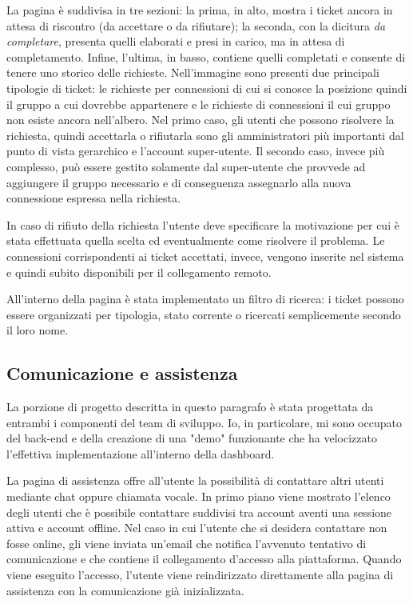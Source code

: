 La pagina è suddivisa in tre sezioni: la prima, in alto, mostra i ticket ancora in attesa di riscontro (da accettare o da rifiutare); la seconda, con la dicitura \textit{da completare}, presenta quelli elaborati e presi in carico, ma in attesa di completamento. Infine, l'ultima, in basso, contiene quelli completati e consente di tenere uno storico delle richieste.
Nell'immagine sono presenti due principali tipologie di ticket: le richieste per connessioni di cui si conosce la posizione quindi il gruppo a cui dovrebbe appartenere e le richieste di connessioni il cui gruppo non esiste ancora nell'albero. Nel primo caso, gli utenti che possono risolvere la richiesta, quindi accettarla o rifiutarla sono gli amministratori più importanti dal punto di vista gerarchico e l'account super-utente. Il secondo caso, invece più complesso, può essere gestito solamente dal super-utente che provvede ad aggiungere il gruppo necessario e di conseguenza assegnarlo alla nuova connessione espressa nella richiesta.

In caso di rifiuto della richiesta l'utente deve specificare la motivazione per cui è stata effettuata quella scelta ed eventualmente come risolvere il problema. Le connessioni corrispondenti ai ticket accettati, invece, vengono inserite nel sistema e quindi subito disponibili per il collegamento remoto.

All'interno della pagina è stata implementato un filtro di ricerca: i ticket possono essere organizzati per tipologia, stato corrente o ricercati semplicemente secondo il loro nome.

\subsection{Comunicazione e assistenza}
\label{sec:comunicazione e assistenza}

La porzione di progetto descritta in questo paragrafo è stata progettata da entrambi i componenti del team di sviluppo. Io, in particolare, mi sono occupato del back-end e della creazione di una "demo" funzionante che ha velocizzato l'effettiva implementazione all'interno della dashboard. 

La pagina di assistenza offre all'utente la possibilità di contattare altri utenti mediante chat oppure chiamata vocale. In primo piano viene mostrato l'elenco degli utenti che è possibile contattare suddivisi tra account aventi una sessione attiva e account offline.
Nel caso in cui l'utente che si desidera contattare non fosse online, gli viene inviata un'email che notifica l'avvenuto tentativo di comunicazione e che contiene il collegamento d'accesso alla piattaforma. Quando viene eseguito l'accesso, l'utente viene reindirizzato direttamente alla pagina di assistenza con la comunicazione già inizializzata.
